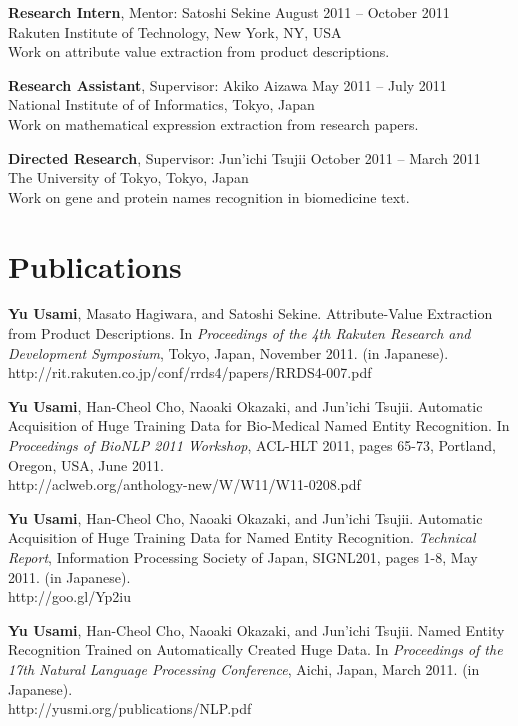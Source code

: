 \documentclass[margin]{res}
\begin{document}
\begin{resume}
\textbf{Research Intern}, Mentor: Satoshi Sekine \hfill August 2011 -- October 2011\\
Rakuten Institute of Technology, New York, NY, USA\\
Work on attribute value extraction from product descriptions. 

\textbf{Research Assistant}, Supervisor: Akiko Aizawa \hfill May 2011 -- July 2011\\
National Institute of of Informatics, Tokyo, Japan\\
Work on mathematical expression extraction from research papers.

\textbf{Directed Research}, Supervisor: Jun'ichi Tsujii \hfill October 2011 -- March 2011\\
The University of Tokyo, Tokyo, Japan\\
Work on gene and protein names recognition in biomedicine text.\\

\section{Publications}
\textbf{Yu Usami}, Masato Hagiwara, and Satoshi Sekine. Attribute-Value Extraction from Product Descriptions.
In \textit{Proceedings of the 4th Rakuten Research and Development Symposium}, Tokyo, Japan, November 2011. (in Japanese).
\\http://rit.rakuten.co.jp/conf/rrds4/papers/RRDS4-007.pdf

\textbf{Yu Usami}, Han-Cheol Cho, Naoaki Okazaki, and Jun'ichi Tsujii. Automatic Acquisition of Huge Training Data for Bio-Medical Named Entity Recognition. 
In \textit{Proceedings of BioNLP 2011 Workshop}, ACL-HLT 2011, pages 65-73, Portland, Oregon, USA, June 2011.
\\http://aclweb.org/anthology-new/W/W11/W11-0208.pdf

\textbf{Yu Usami}, Han-Cheol Cho, Naoaki Okazaki, and Jun'ichi Tsujii. Automatic Acquisition of Huge Training Data for Named Entity Recognition.
\textit{Technical Report}, Information Processing Society of Japan, SIGNL201, pages 1-8, May 2011. (in Japanese).
\\http://goo.gl/Yp2iu

\textbf{Yu Usami}, Han-Cheol Cho, Naoaki Okazaki, and Jun'ichi Tsujii. Named Entity Recognition Trained on Automatically Created Huge Data.
In \textit{Proceedings of the 17th Natural Language Processing Conference}, Aichi, Japan, March 2011. (in Japanese).
\\http://yusmi.org/publications/NLP.pdf\\


\end{resume}
\end{document}

